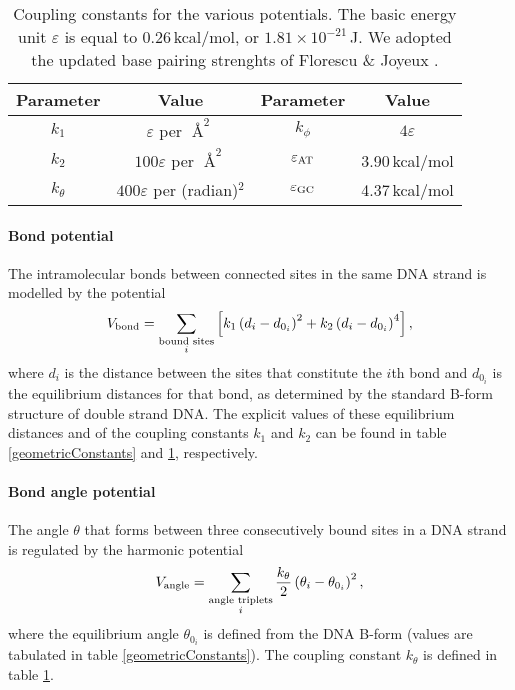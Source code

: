 \begin{table}[hbt]
\begin{center}
\caption{Coupling constants for the various potentials. The basic energy unit $\varepsilon$ is equal to $0.26$\,kcal/mol, or $1.81 \times 10^{-21}$\,J.
We adopted the updated base pairing strenghts of Florescu \& Joyeux \cite{florescu2011thermal}.}
\begin{tabular}{cc||cc}
Parameter & Value & Parameter & Value\\\hline
$k_1$ & $\varepsilon$ per $\Angstrom^2$ &
	$k_\phi$ & $4\varepsilon$ \\
$k_2$ & $100\varepsilon$ per $\Angstrom^2$ &
	$\varepsilon_\text{AT}$ & 3.90\,kcal/mol\\
$k_\theta$ & $400\varepsilon$ per (radian)$^2$ &
	$\varepsilon_\text{GC}$ & 4.37\,kcal/mol\\
\end{tabular}\label{couplingConstants}
\end{center}
\end{table}









\paragraph{Bond potential}
The intramolecular bonds between connected sites in the same DNA strand is modelled by the potential
\begin{equation}
V_\text{bond}
= \sum_{\substack{\text{bound sites}\\i}} \left[
	k_1 \left(d_i - d_{0_i}\right)^2
	+ k_2 \left(d_i - d_{0_i}\right)^4
\right],
\end{equation}
where $d_i$ is the distance between the sites that constitute the $i$th bond and $d_{0_i}$ is the equilibrium distances for that bond, as determined by the standard B-form structure of double strand DNA. The explicit values of these equilibrium distances and of the coupling constants $k_1$ and $k_2$ can be found in table \ref{geometricConstants} and \ref{couplingConstants}, respectively.


\paragraph{Bond angle potential}
The angle $\theta$ that forms between three consecutively bound sites in a DNA strand is regulated by the harmonic potential
\begin{equation}
V_\text{angle}
= \sum_{\substack{\text{angle triplets}\\i}}
	\frac{k_\theta}{2} \left(
		\theta_i - \theta_{0_i}
	\right)^2,
\end{equation}
where the equilibrium angle $\theta_{0_i}$ is defined from the DNA B-form (values are tabulated in table \ref{geometricConstants}). The coupling constant $k_\theta$ is defined in table \ref{couplingConstants}.


